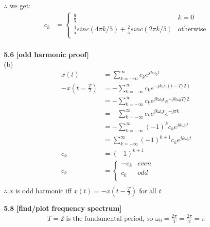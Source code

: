 \documentclass{article}
\begin{document}
$\therefore$ we get:
\begin{equation*}
\begin{split}
    c_k
    &= \begin{cases}
        \frac{6}{5} & k = 0\\
        \frac{4}{5} sinc(4 \pi k/5) + \frac{2}{5} sinc(2 \pi k/5) & \text{otherwise}\\
    \end{cases}\\
\end{split}
\end{equation*}


\bigskip
{\bf 5.6 [odd harmonic proof]}\\
(b)
\begin{equation*}
\begin{split}
    x(t) &= \sum_{k = -\infty}^{\infty}c_ke^{jk\omega_0t}\\
    -x(t=\frac{T}{2}) &= -\sum_{k = -\infty}^{\infty}c_ke^{-jk\omega_0(t-T/2)}\\
    &= -\sum_{k = -\infty}^{\infty}c_ke^{jk\omega_0t} e^{-jk\omega_0T/2}\\
    &= -\sum_{k = -\infty}^{\infty}c_ke^{jk\omega_0t} e^{-j\pi k}\\
    &= -\sum_{k = -\infty}^{\infty}(-1)^{k}c_k e^{jk\omega_0t}\\
    &= \sum_{k = -\infty}^{\infty}(-1)^{k + 1}c_k e^{jk\omega_0t}\\
    c_k &= (-1)^{k + 1}\\
    c_k
    &= \begin{cases}
        -c_k & even\\
        c_k & odd\\
    \end{cases}\\
\end{split}
\end{equation*}
$\therefore \; x$ is odd harmonic iff $x(t) = -x(t - \frac{T}{2})$ for all $t$

\bigskip
{\bf 5.8 [find/plot frequency spectrum]}\\
\begin{equation*}
\begin{split}
    T = 2 \text{ is the fundamental period, so } \omega_0 = \frac{2\pi}{T} = \frac{2\pi}{2} = \pi\\
\end{split}
\end{equation*}
\end{document}
